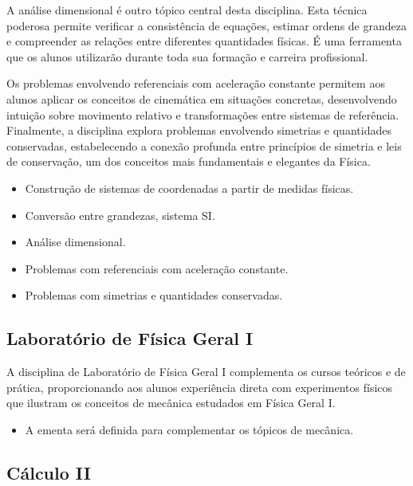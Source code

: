 \documentclass[a4paper, 12pt]{article}
\newcounter{fis}
\newcounter{mat}
\begin{document}
A análise dimensional é outro tópico central desta disciplina. Esta técnica poderosa
permite verificar a consistência de equações, estimar ordens de grandeza e compreender
as relações entre diferentes quantidades físicas. É uma ferramenta que os alunos
utilizarão durante toda sua formação e carreira profissional.

Os problemas envolvendo referenciais com aceleração constante permitem aos alunos
aplicar os conceitos de cinemática em situações concretas, desenvolvendo intuição sobre
movimento relativo e transformações entre sistemas de referência. Finalmente, a
disciplina explora problemas envolvendo simetrias e quantidades conservadas,
estabelecendo a conexão profunda entre princípios de simetria e leis de conservação, um
dos conceitos mais fundamentais e elegantes da Física.

\begin{tcolorbox}[title=Ementa:]
    \begin{itemize}
        \item Construção de sistemas de coordenadas a partir de medidas físicas.
        \item Conversão entre grandezas, sistema SI.
        \item Análise dimensional.
        \item Problemas com referenciais com aceleração constante.
        \item Problemas com simetrias e quantidades conservadas.
    \end{itemize}
\end{tcolorbox}

\subsection{Laboratório de Física Geral I}
\label{fis003}

A disciplina de Laboratório de Física Geral I complementa os cursos teóricos e de
prática, proporcionando aos alunos experiência direta com experimentos físicos que
ilustram os conceitos de mecânica estudados em Física Geral I.

\begin{tcolorbox}[title=Ementa:]
    \begin{itemize}
        \item A ementa será definida para complementar os tópicos de mecânica.
    \end{itemize}
\end{tcolorbox}

\subsection{Cálculo II}
\label{mat003}
\end{document}
